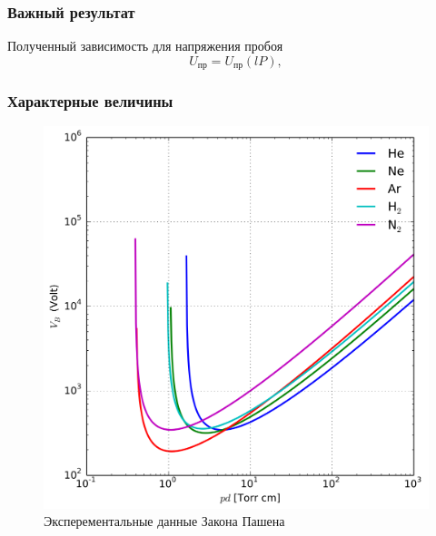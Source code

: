 \documentclass{beamer}
\begin{document}

\begin{frame}
\frametitle{Важный результат}
\begin{block}{Полученный зависимость для напряжения пробоя}
\begin{equation*}
    U_{\text{пр}} = U_{\text{пр}}(lP),
\end{equation*}
\end{block}
\end{frame}

\begin{frame}

\frametitle{Характерные величины}

\begin{figure}[H]
        \centering
        \includegraphics[scale=0.18]{./pics/pashean_lines.png}
        \caption{Эксперементальные данные Закона Пашена}
\end{figure}

\end{frame}

\end{document}
